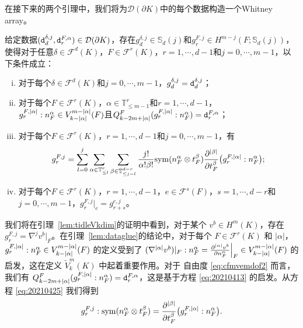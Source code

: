 在接下来的两个引理中，我们将为$\mathcal D(\partial
K)$中的每个数据构造一个Whitney array。

\begin{lemma}\label{lem:dataglue}
给定数据$(\textnormal{\texttt{d}}_{d}^{\delta, j}, \textnormal{\texttt{d}}_{r}^{F, \alpha})\in\mathcal D(\partial K)$，存在$g_{d}^{\delta,j}\in\mathbb S_d(j)$和$g_{r}^{F,j}\in H^{m-j}(F;\mathbb S_d(j))$，使得对于任意$\delta\in\mathcal F^d(K)$，$F\in\mathcal F^r(K)$，$r=1,\cdots, d-1$和$j=0,\cdots,m-1$，以下条件成立：
\begin{enumerate}[(i)]
\item 对于每个$\delta\in\mathcal F^d(K)$和$j=0,\cdots,m-1$，$g_{d}^{\delta,j}=\textnormal{\texttt{d}}_{d}^{\delta, j}$；
\item 对于每个$F\in\mathcal F^r(K)$，$\alpha\in \mathbb{T}^r_{\leq m-1}$和$r=1,\cdots, d-1$，$g_{r}^{F,|\alpha|}:n_F^{\alpha}\in V_{k-|\alpha|}^{m-|\alpha|}(F)$且$Q_{k-2m+|\alpha|}^F(g_{r}^{F,|\alpha|}:n_F^{\alpha})=\textnormal{\texttt{d}}_{r}^{F,\alpha}$；
\item 对于每个$F\in\mathcal F^r(K)$，$r=1,\cdots, d-1$和$j=0,\cdots,m-1$，有
\begin{equation}\label{eq:20210425}
    g_{r}^{F,j} = \sum_{l=0}^{j}\sum_{\alpha\in \mathbb{T}^r_{\leq
    l}}\sum_{\beta\in \mathbb{T}^{d-r}_{\leq
    j-l}}\frac{j!}{\alpha!\beta!}\mathrm{sym}(n_F^{\alpha}\otimes t_{F}^{\beta})\frac{\partial^{|\beta|}}{\partial t_{F}^{\beta}}\big(g_{r}^{F,|\alpha|}:n_F^{\alpha}\big);
\end{equation}
\item 对于每个$F\in\mathcal F^ r(K)$，$r=1,\cdots, d-1$，$e\in\mathcal F^s(F)$，$s=1,\cdots, d-r$和$j=0,\cdots,m-1$，$g_{r}^{F,j}|_e=g_{r+s}^{e,j}$。
\end{enumerate}
\end{lemma}

\begin{remark}
我们将在引理~\ref{lem:tidleVkdim}的证明中看到，对于某个 \( v^b\in H^m(K) \)，存在 \( g_{r}^{F, j}=\nabla^jv^b|_F \)。在引理~\ref{lem:dataglue}的结论中，对于每个 \( F \in \mathcal{F}^r(K) \) 和 \( |\alpha| \)，\( g_{r}^{F,|\alpha|}:n_F^{\alpha}\in V_{k-|\alpha|}^{m-|\alpha|}(F) \) 的定义受到了 \( (\nabla^{|\alpha|}v^b)|_F:n_F^{\alpha}=\frac{\partial^{|\alpha|}v^b}{\partial n_F^{\alpha}}\Big|_F\in V_{k-|\alpha|}^{m-|\alpha|}(F) \) 的启发，这在定义 \( \widetilde{V}_k^m(K) \) 中起着重要作用。对于 自由度 \eqref{eq:cfmvemdof2} 而言，我们有 \( Q_{k-2m+|\alpha|}^F(g_{r}^{F,|\alpha|}:n_F^{\alpha})=\textnormal{\texttt{d}}_{r}^{F,\alpha} \)，这是基于方程 \eqref{eq:20210413} 的启发。从方程 \eqref{eq:20210425} 我们得到
$$
g_{r}^{F,j}:\mathrm{sym}(n_F^{\alpha}\otimes t_{F}^{\beta}) = \frac{\partial^{|\beta|}}{\partial t_{F}^{\beta}}\big(g_{r}^{F,|\alpha|}:n_F^{\alpha}\big).
$$
\end{remark}

